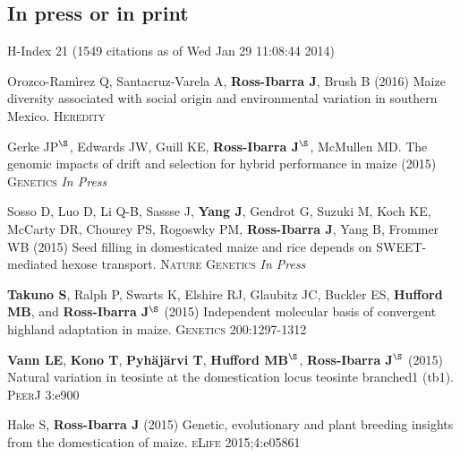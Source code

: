 \documentclass[letterpaper]{article}
\begin{document}
\subsection*{In press or in print} %
H-Index 21 {\small(1549 citations as of Wed Jan 29 11:08:44 2014)}
\begin{etaremune}

\vspace{-2ex}
\item Orozco-Ram\`{i}rez Q, Santacruz-Varela A, {\bf Ross-Ibarra J}, Brush B (2016) Maize diversity associated with social origin and environmental variation in southern Mexico. \textsc{Heredity} 

\vspace{-2ex}
\item Gerke JP$^\S$, Edwards JW, Guill KE, {\bf Ross-Ibarra J}$^\S$, McMullen MD.  The genomic impacts of drift and selection for hybrid performance in maize (2015) \textsc{Genetics} \emph{In Press}

\vspace{-2ex}
\item Sosso D, Luo D, Li Q-B, Sassse J, {\bf Yang J}, Gendrot G, Suzuki M, Koch KE, McCarty DR, Chourey PS, Rogoswky PM, {\bf Ross-Ibarra J}, Yang B, Frommer WB (2015) Seed filling in domesticated maize and rice depends on SWEET-mediated hexose transport. \textsc{Nature Genetics} \emph{In Press}

\vspace{-2ex}
\item {\bf Takuno S}, Ralph P, Swarts K, Elshire RJ, Glaubitz JC, Buckler ES, {\bf Hufford MB}, and {\bf Ross-Ibarra J}$^\S$ (2015) Independent molecular basis of convergent highland adaptation in maize. \textsc{Genetics} 200:1297-1312

\vspace{-2ex}
\item {\bf Vann LE}, {\bf Kono T}, {\bf Pyh\"aj\"arvi T}, {\bf Hufford MB}$^\S$, {\bf Ross-Ibarra J}$^\S$ (2015) Natural variation in teosinte at the domestication locus teosinte branched1 (tb1). \textsc{PeerJ} 3:e900

\vspace{-2ex}
\item Hake S, {\bf Ross-Ibarra J} (2015) Genetic, evolutionary and plant breeding insights from the domestication of maize. \textsc{eLife}  2015;4:e05861


\end{etaremune}
\end{document}
